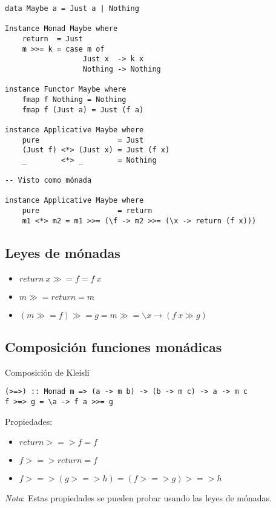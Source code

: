 \documentclass{article}
\newcommand{\imp}[1]{\textcolor{color1}{#1}}
\begin{document}
\begin{lstlisting}
data Maybe a = Just a | Nothing

Instance Monad Maybe where
    return  = Just
    m >>= k = case m of
                  Just x  -> k x
                  Nothing -> Nothing 

instance Functor Maybe where
    fmap f Nothing = Nothing
    fmap f (Just a) = Just (f a)
    
instance Applicative Maybe where
    pure                  = Just
    (Just f) <*> (Just x) = Just (f x)
    _        <*> _        = Nothing
    
-- Visto como mónada

instance Applicative Maybe where
    pure                  = return
    m1 <*> m2 = m1 >>= (\f -> m2 >>= (\x -> return (f x)))
\end{lstlisting}

\subsection{Leyes de mónadas}

\begin{itemize}
\item $return~x \gg = f = f~x$
\item $m \gg = return = m$
\item $(m \gg = f) \gg = g = m \gg = \backslash x \rightarrow (f~x \gg g)$
\end{itemize}

\subsection{Composición funciones monádicas}

Composición de Kleisli

\begin{lstlisting}
(>=>) :: Monad m => (a -> m b) -> (b -> m c) -> a -> m c
f >=> g = \a -> f a >>= g
\end{lstlisting}

Propiedades:

\begin{itemize}
\item $return >=> f = f$
\item $f >=> return = f$
\item $f >=> (g >=> h) = (f >=> g) >=> h$
\end{itemize}

\imp{\emph{Nota}}: Estas propiedades se pueden probar usando las leyes de mónadas.
\end{document}
